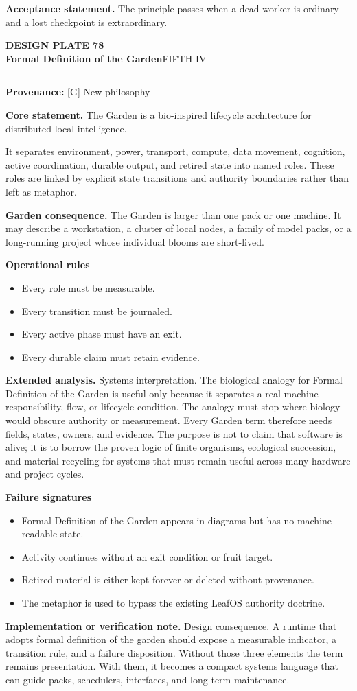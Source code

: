 \documentclass[10pt,letterpaper,oneside]{article}
\newcommand{\prov}[1]{\textcolor{gardenBlue}{\sffamily\footnotesize\textbf{Provenance:} #1}}
\newcommand{\platetitle}[3]{%
  \begin{minipage}[t][0.54in][t]{\textwidth}
  {\sffamily\bfseries\color{gardenDeep}\fontsize{9}{10}\selectfont DESIGN PLATE #1}\\[-1pt]
  {\sffamily\bfseries\color{gardenInk}\fontsize{16.5}{18}\selectfont #2}\hfill{\sffamily\color{gardenGreen}\large #3}
  \end{minipage}\vspace{-2pt}\hrule\vspace{5pt}}
\begin{document}
\begin{acceptbox}
\textbf{Acceptance statement.} The principle passes when a dead worker is ordinary and a lost checkpoint is extraordinary.
\end{acceptbox}
\newpage
\platetitle{78}{Formal Definition of the Garden}{FIFTH IV}
\prov{[G] New philosophy}
\fontsize{8.85}{10.45}\selectfont
\begin{corebox}
\textbf{Core statement.} The Garden is a bio-inspired lifecycle architecture for distributed local intelligence.
\end{corebox}
It separates environment, power, transport, compute, data movement, cognition, active coordination, durable output, and retired state into named roles. These roles are linked by explicit state transitions and authority boundaries rather than left as metaphor.

\textbf{Garden consequence.} The Garden is larger than one pack or one machine. It may describe a workstation, a cluster of local nodes, a family of model packs, or a long-running project whose individual blooms are short-lived.

\textbf{Operational rules}
\begin{itemize}
\item Every role must be measurable.
\item Every transition must be journaled.
\item Every active phase must have an exit.
\item Every durable claim must retain evidence.
\end{itemize}
\textbf{Extended analysis.} Systems interpretation. The biological analogy for Formal Definition of the Garden is useful only because it separates a real machine responsibility, flow, or lifecycle condition. The analogy must stop where biology would obscure authority or measurement. Every Garden term therefore needs fields, states, owners, and evidence. The purpose is not to claim that software is alive; it is to borrow the proven logic of finite organisms, ecological succession, and material recycling for systems that must remain useful across many hardware and project cycles.

\textbf{Failure signatures}
\begin{itemize}
\item Formal Definition of the Garden appears in diagrams but has no machine-readable state.
\item Activity continues without an exit condition or fruit target.
\item Retired material is either kept forever or deleted without provenance.
\item The metaphor is used to bypass the existing LeafOS authority doctrine.
\end{itemize}
\textbf{Implementation or verification note.} Design consequence. A runtime that adopts formal definition of the garden should expose a measurable indicator, a transition rule, and a failure disposition. Without those three elements the term remains presentation. With them, it becomes a compact systems language that can guide packs, schedulers, interfaces, and long-term maintenance.
\end{document}
